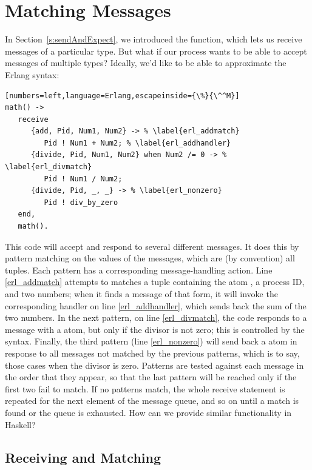 \documentclass[preprint]{sigplanconf}
\begin{document}
\section{Matching Messages}
\label{s:matching}

In Section~\ref{s:sendAndExpect}, we introduced the  function, which lets us receive messages of a particular type. But what if our process wants to be able to accept messages of multiple types? Ideally, we'd like to be able to approximate the Erlang  syntax:
\begin{lstlisting}[numbers=left,language=Erlang,escapeinside={\%}{\^^M}]
math() ->
   receive
      {add, Pid, Num1, Num2} -> % \label{erl_addmatch}
         Pid ! Num1 + Num2; % \label{erl_addhandler}
      {divide, Pid, Num1, Num2} when Num2 /= 0 -> % \label{erl_divmatch}
         Pid ! Num1 / Num2;
      {divide, Pid, _, _} -> % \label{erl_nonzero}
         Pid ! div_by_zero
   end,
   math().
\end{lstlisting}

This code will accept and respond to several different messages. It does this by pattern matching on the values of the messages, which are (by convention) all tuples. Each pattern has a corresponding message-handling action. 
Line \ref{erl_addmatch} attempts to matches a tuple containing the atom , a process ID, and two numbers; when it finds a message of that form, it will invoke the corresponding handler on line \ref{erl_addhandler}, which sends back the sum of the two numbers. 
In the next pattern, on line \ref{erl_divmatch}, the code responds to a message with a  atom, but only if the divisor is not zero; this is controlled by the  syntax. 
Finally, the third pattern (line \ref{erl_nonzero}) will send back a  atom in response to all messages not matched by the previous patterns, which is to say, those cases when the divisor is zero.
Patterns are tested against each message in the order that they appear, so that the last pattern will be reached only if the first two fail to match.
If no patterns match, the whole receive statement is repeated for the next element of the message queue, and so on until a match is found or the queue is exhausted.
How can we provide similar functionality in Haskell?

\subsection{Receiving and Matching}
\end{document}
